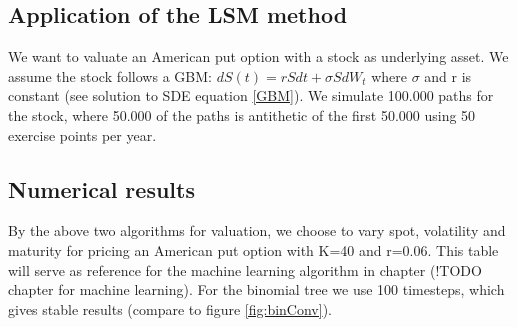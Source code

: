 \subsection{Application of the LSM method}
We want to valuate an American put option with a stock as underlying asset. We assume the stock follows a GBM: $dS(t)=rSdt + \sigma S dW_t$ where $\sigma$ and r is constant (see solution to SDE equation \ref{GBM}). We simulate 100.000 paths for the stock, where 50.000 of the paths is antithetic of the first 50.000 using 50 exercise points per year. 

\parencite{lsm}  

\subsection{Numerical results}
By the above two algorithms for valuation, we choose to vary spot, volatility and maturity for pricing an American put option with K=40 and r=0.06. This table will serve as reference for the machine learning algorithm in chapter (!TODO chapter for machine learning). For the binomial tree we use 100 timesteps, which gives stable results (compare to figure \ref{fig:binConv}). 
